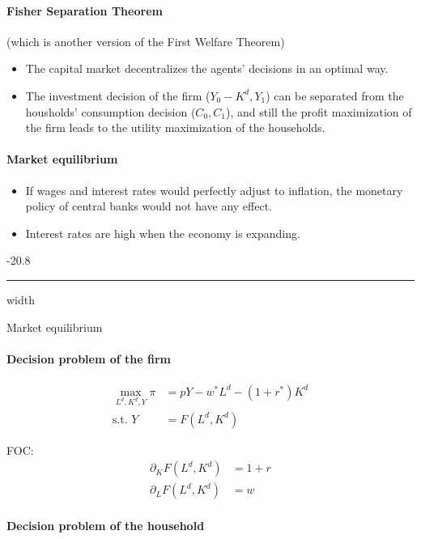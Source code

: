 \documentclass[a4paper,landscape,7pt,fleqn]{scrartcl}
\makeatletter
\renewcommand{\subsubsection}{\@startsection{subsubsection}{1}{0mm}%
{-2\baselineskip}{0.8\baselineskip}%
{\hrule depth 0.2pt width\columnwidth\vspace*{1.2em}\normalsize\bfseries}}
\makeatother
\begin{document}
\begin{multicols*}{3}
\paragraph{Fisher Separation Theorem}

(which is another version of the First Welfare Theorem)

\begin{itemize}
\item The capital market decentralizes the agents' decisions in an optimal way.
\item The investment decision of the firm ($Y_0-K^d, Y_1$) can be separated from the housholds' consumption decision ($C_0, C_1$), and still the profit maximization of the firm leads to the utility maximization of the households.
\end{itemize}

\paragraph{Market equilibrium}

\begin{itemize}
\item If wages and interest rates would perfectly adjust to inflation, the monetary policy of central banks would not have any effect.
\item Interest rates are high when the economy is expanding.
\end{itemize}

\subsubsection{Market equilibrium}

\paragraph{Decision problem of the firm}

\begin{align*}
\max\limits_{L^d, K^d, Y} \pi &= p Y - w^\ast L^d - (1+r^\ast) K^d \\
\text{s.t. } Y &= F(L^d,K^d)
\end{align*}

FOC:
\begin{align*}
\partial_K F(L^d,K^d) &= 1+r \\
\partial_L F(L^d,K^d) &= w
\end{align*}

\paragraph{Decision problem of the household}


\end{multicols*}
\end{document}
